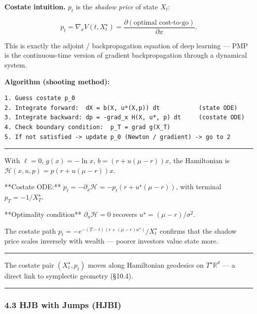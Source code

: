 \documentclass[11pt,a4paper]{article}
\begin{document}
\textbf{Costate intuition.} \(p_t\) is the \emph{shadow price} of state \(X_t\):

\[p_t = \nabla_x V(t, X_t^\star) = \frac{\partial (\text{optimal cost-to-go})}{\partial x}.\]

This is exactly the adjoint / backpropagation equation of deep learning --- PMP is the continuous-time version of gradient backpropagation through a dynamical system.

\textbf{Algorithm (shooting method):}

\begin{verbatim}
1. Guess costate p_0
2. Integrate forward:  dX = b(X, u*(X,p)) dt           (state ODE)
3. Integrate backward: dp = -grad_x H(X, u*, p) dt     (costate ODE)
4. Check boundary condition:  p_T = grad g(X_T)
5. If not satisfied -> update p_0 (Newton / gradient) -> go to 2
\end{verbatim}

\begin{center}\rule{0.5\linewidth}{0.5pt}\end{center}

\begin{tcolorbox}[colback=notebg!60,colframe=optgreen,fonttitle=\bfseries\sffamily,title={\textsf{\textbf{Example}} — Example — PMP for the Merton Problem},breakable]
With $\ell = 0$, $g(x) = -\ln x$, $b = (r+u(\mu-r))x$,
the Hamiltonian is $\mathcal{H}(x,u,p) = p(r+u(\mu-r))x$.

**Costate ODE:**
$\dot p_t = -\partial_x \mathcal{H} = -p_t(r+u^\star(\mu-r))$,
with terminal $p_T = -1/X_T^\star$.

**Optimality condition** $\partial_u\mathcal{H}=0$ recovers $u^\star = (\mu-r)/\sigma^2$.

The costate path $p_t = -e^{-(T-t)(r+(\mu-r)u^\star)}/X_t^\star$ confirms that the
shadow price scales inversely with wealth — poorer investors value state more.
\end{tcolorbox}

\begin{center}\rule{0.5\linewidth}{0.5pt}\end{center}

The costate pair \((X_t^\star, p_t)\) moves along Hamiltonian geodesics on \(T^\star\mathbb{R}^d\) --- a direct link to symplectic geometry (§10.4).

\begin{center}\rule{0.5\linewidth}{0.5pt}\end{center}

\subsubsection{4.3 HJB with Jumps (HJBI)}\label{hjb-with-jumps-hjbi}
\end{document}

